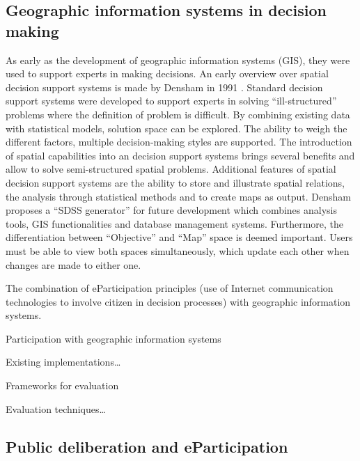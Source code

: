 \subsection{Geographic information systems in decision making}

As early as the development of geographic information systems (GIS), they were used to support experts in making decisions. An early overview over spatial decision support systems is made by Densham in 1991 \cite{densham_sdss}. Standard decision support systems were developed to support experts in solving ``ill-structured'' problems where the definition of problem is difficult. By combining existing data with statistical models, solution space can be explored. The ability to weigh the different factors, multiple decision-making styles are supported. The introduction of spatial capabilities into an decision support systems brings several benefits and allow to solve semi-structured spatial problems. Additional features of spatial decision support systems are the ability to store and illustrate spatial relations, the analysis through statistical methods and to create maps as output. Densham proposes a ``SDSS generator'' for future development which combines analysis tools, GIS functionalities and database management systems. Furthermore, the differentiation between ``Objective'' and ``Map'' space is deemed important. Users must be able to view both spaces simultaneously, which update each other when changes are made to either one.




  The combination of eParticipation principles (use of Internet communication technologies to involve citizen in decision processes) with geographic information systems.






Participation with geographic information systems \cite{zhao2006geodf} \cite{Tang2005_PPGIS_discussion_forum} \cite{Rinner_ArgumentationMaps} \cite{Schlossberg2005_PPGIS}  \cite{Jankowski2005_community_based_pgis} \cite{Longueville2010_community_based_geoportals_web20} \cite{Rinner2009_Web2_argumap} \cite{sidlar_argumap_2007} \cite{Simao2009Webbased} \cite{Voss2004_Evolution_PGIS} \cite{Blaschke2004_PGIS_critically_revised} \cite{Sieber2006_PublicParticipationGIS}


Existing implementations\dots \cite{Rinner2007_geovis_decisionsupport} \cite{Boroushaki2010_ParticipatoryGIS} \cite{Kessler2005_ArgumentationMapPrototype} \cite{Kessler2005_Conflict_Resolution} \cite{Meng2010_ArgooMap_evaluation} \cite{Meng2010_WebPPGIS_Usability} \cite{Sani2011_Scalable_Argumap}


Frameworks for evaluation \cite{Walker2013Qualitative}

Evaluation techniques\dots 


\subsection{Public deliberation and eParticipation}

